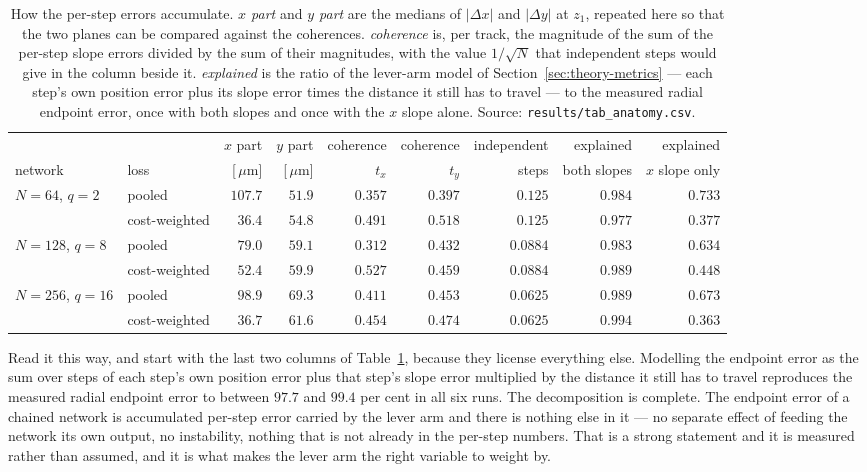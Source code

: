 \documentclass[11pt,a4paper]{article}
\newcommand{\um}{\ensuremath{\,\mu\mathrm{m}}}
\begin{document}
\begin{table}[tbp]
  \centering
  \caption{How the per-step errors accumulate. \emph{$x$ part} and \emph{$y$
  part} are the medians of $|\Delta x|$ and $|\Delta y|$ at $z_1$, repeated
  here so that the two planes can be compared against the coherences.
  \emph{coherence} is, per track, the magnitude of the sum of the per-step slope
  errors divided by the sum of their magnitudes, with the value
  $1/\sqrt{N}$ that independent steps would give in the column beside it.
  \emph{explained} is the ratio of the lever-arm model of
  Section~\ref{sec:theory-metrics} --- each step's own position error plus its
  slope error times the distance it still has to travel --- to the measured
  radial endpoint error, once with both slopes and once with the $x$ slope
  alone. Source: \texttt{results/tab\_anatomy.csv}.}
  \label{tab:anatomyend}
  \footnotesize
  \setlength{\tabcolsep}{3pt}
  \begin{tabular}{llrrrrrrr}
    \toprule
    & & $x$ part & $y$ part & coherence & coherence & independent
      & explained & explained \\
    network & loss & [\!\um] & [\!\um] & $t_x$ & $t_y$ & steps
      & both slopes & $x$ slope only \\
    \midrule
    $N = 64$, $q = 2$   & pooled        & $107.7$ & $51.9$ & $0.357$ & $0.397$ & $0.125$  & $0.984$ & $0.733$ \\
                        & cost-weighted & $36.4$  & $54.8$ & $0.491$ & $0.518$ & $0.125$  & $0.977$ & $0.377$ \\
    \addlinespace
    $N = 128$, $q = 8$  & pooled        & $79.0$  & $59.1$ & $0.312$ & $0.432$ & $0.0884$ & $0.983$ & $0.634$ \\
                        & cost-weighted & $52.4$  & $59.9$ & $0.527$ & $0.459$ & $0.0884$ & $0.989$ & $0.448$ \\
    \addlinespace
    $N = 256$, $q = 16$ & pooled        & $98.9$  & $69.3$ & $0.411$ & $0.453$ & $0.0625$ & $0.989$ & $0.673$ \\
                        & cost-weighted & $36.7$  & $61.6$ & $0.454$ & $0.474$ & $0.0625$ & $0.994$ & $0.363$ \\
    \bottomrule
  \end{tabular}
\end{table}

Read it this way, and start with the last two columns of
Table~\ref{tab:anatomyend}, because they license everything else. Modelling the
endpoint error as the sum over steps of each step's own position error plus that
step's slope error multiplied by the distance it still has to travel reproduces
the measured radial endpoint error to between $97.7$ and $99.4$ per cent in all
six runs. The decomposition is complete. The endpoint error of a chained network
is accumulated per-step error carried by the lever arm and there is nothing else
in it --- no separate effect of feeding the network its own output, no
instability, nothing that is not already in the per-step numbers. That is a
strong statement and it is measured rather than assumed, and it is what makes
the lever arm the right variable to weight by.
\end{document}
